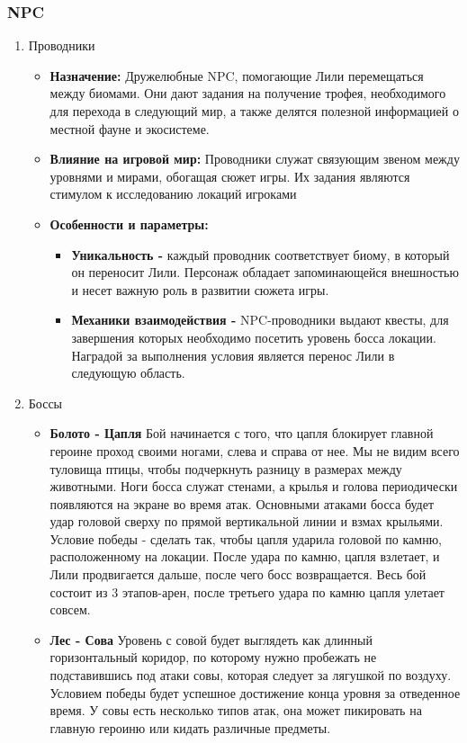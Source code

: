 \documentclass{article}
\begin{document}
\subsubsection{NPC}
\begin{enumerate}

\item Проводники
    \begin{itemize}
     \item \textbf{Назначение:} Дружелюбные NPC, помогающие Лили перемещаться между биомами. Они дают задания на получение трофея, необходимого для перехода в следующий мир, а также делятся полезной информацией о местной фауне и экосистеме. 
     \item \textbf{Влияние на игровой мир:} Проводники служат связующим звеном между уровнями и мирами, обогащая сюжет игры. Их задания являются стимулом к исследованию локаций игроками
     \item \textbf{Особенности и параметры:}
     \begin{itemize}
            \item \textbf{Уникальность -} каждый проводник соответствует биому, в который он переносит Лили. Персонаж обладает запоминающейся внешностью и несет важную роль в развитии сюжета игры.
            \item \textbf{Механики взаимодействия -} NPC-проводники выдают квесты, для завершения которых необходимо посетить уровень босса локации. Наградой за выполнения условия является перенос Лили в следующую область.
     \end {itemize}
     \end{itemize}
\item Боссы
    \begin{itemize}
     \item \textbf{Болото - Цапля} Бой начинается с того, что цапля  блокирует главной героине проход своими ногами, слева и справа от нее. Мы не видим всего туловища птицы, чтобы подчеркнуть разницу в размерах между животными. Ноги босса служат стенами, а крылья и голова периодически появляются на экране во время атак. Основными атаками босса будет удар головой сверху по прямой вертикальной линии и взмах крыльями. Условие победы - сделать так, чтобы цапля ударила головой по камню, расположенному на локации. После удара по камню, цапля взлетает, и Лили продвигается дальше, после чего босс возвращается. Весь бой состоит из 3 этапов-арен, после третьего удара по камню цапля улетает совсем.
     \item \textbf{Лес - Сова} Уровень с совой будет выглядеть как длинный горизонтальный коридор, по которому нужно пробежать не подставившись под атаки совы, которая следует за лягушкой по воздуху. Условием победы будет успешное достижение конца уровня за отведенное время. У совы есть несколько типов атак, она может пикировать на главную героиню или кидать различные предметы. 

\end{itemize}
\end{enumerate}
\end{document}
